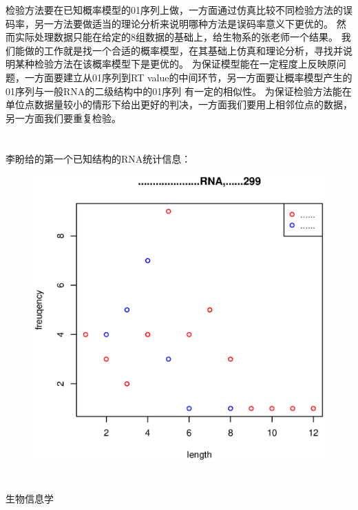 \documentclass[12pt]{article}
\begin{document}
\title{\textbf{}} 

\author{}
\maketitle
\large
\section{\textbf{}}
检验方法要在已知概率模型的01序列上做，一方面通过仿真比较不同检验方法的误码率，另一方法要做适当的理论分析来说明哪种方法是误码率意义下更优的。
然而实际处理数据只能在给定的8组数据的基础上，给生物系的张老师一个结果。
我们能做的工作就是找一个合适的概率模型，在其基础上仿真和理论分析，寻找并说明某种检验方法在该概率模型下是更优的。
为保证模型能在一定程度上反映原问题，一方面要建立从01序列到RT value的中间环节，另一方面要让概率模型产生的01序列与一般RNA的二级结构中的01序列
有一定的相似性。
为保证检验方法能在单位点数据量较小的情形下给出更好的判决，一方面我们要用上相邻位点的数据，另一方面我们要重复检验。
\section{\textbf{}}
李盼给的第一个已知结构的RNA统计信息：
\begin{figure}
\includegraphics{Plotting2.eps}
\end{figure}
\section{\textbf{}}
\begin{thebibliography}{}
 生物信息学
 
\end{thebibliography}
\end{document}
